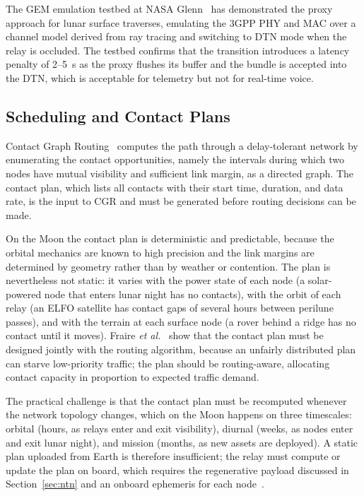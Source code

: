 \documentclass[11pt,a4paper]{article}
\begin{document}
The GEM emulation testbed at NASA Glenn~\cite{nasa_lunar_3gpp_gem} has demonstrated the proxy approach for lunar surface traverses, emulating the 3GPP PHY and MAC over a channel model derived from ray tracing and switching to DTN mode when the relay is occluded. The testbed confirms that the transition introduces a latency penalty of \SI{2}{}--\SI{5}{\second} as the proxy flushes its buffer and the bundle is accepted into the DTN, which is acceptable for telemetry but not for real-time voice.

\subsection{Scheduling and Contact Plans}
Contact Graph Routing~\cite{burleigh_cgr} computes the path through a delay-tolerant network by enumerating the contact opportunities, namely the intervals during which two nodes have mutual visibility and sufficient link margin, as a directed graph. The contact plan, which lists all contacts with their start time, duration, and data rate, is the input to CGR and must be generated before routing decisions can be made.

On the Moon the contact plan is deterministic and predictable, because the orbital mechanics are known to high precision and the link margins are determined by geometry rather than by weather or contention. The plan is nevertheless not static: it varies with the power state of each node (a solar-powered node that enters lunar night has no contacts), with the orbit of each relay (an ELFO satellite has contact gaps of several hours between perilune passes), and with the terrain at each surface node (a rover behind a ridge has no contact until it moves). Fraire \emph{et al.}~\cite{fraire_contact_plan} show that the contact plan must be designed jointly with the routing algorithm, because an unfairly distributed plan can starve low-priority traffic; the plan should be routing-aware, allocating contact capacity in proportion to expected traffic demand.

The practical challenge is that the contact plan must be recomputed whenever the network topology changes, which on the Moon happens on three timescales: orbital (hours, as relays enter and exit visibility), diurnal (weeks, as nodes enter and exit lunar night), and mission (months, as new assets are deployed). A static plan uploaded from Earth is therefore insufficient; the relay must compute or update the plan on board, which requires the regenerative payload discussed in Section~\ref{sec:ntn} and an onboard ephemeris for each node~\cite{nasa_onboard_lunanet}.
\end{document}
